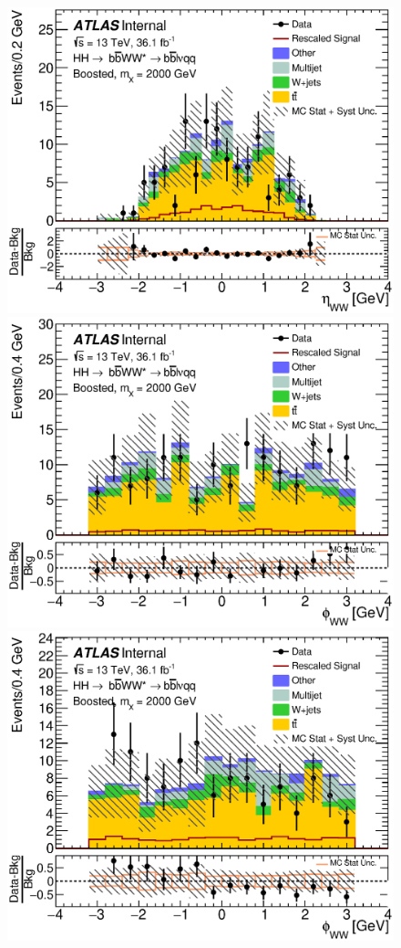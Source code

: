 \begin{figure}[h]
\begin{center}
\includegraphics[scale=0.33]{figures/kinplots/new/C_2tag_SR_muon_presel_met50_WWEta}\\
\includegraphics[scale=0.33]{figures/kinplots/new/C_2tag_SR_elec_presel_met50_WWPhi}
\includegraphics[scale=0.33]{figures/kinplots/new/C_2tag_SR_muon_presel_met50_WWPhi}

\end{center}
\end{figure}
